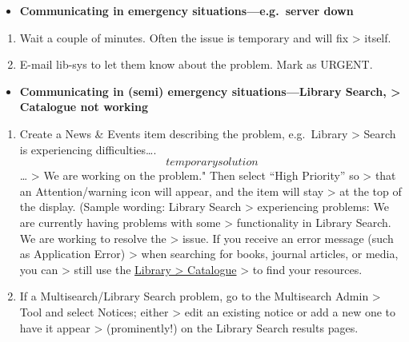 \documentclass[
  openany]{book}
\providecommand{\tightlist}{%
  \setlength{\itemsep}{0pt}\setlength{\parskip}{0pt}}
\begin{document}
\begin{itemize}
\tightlist
\item
  \textbf{Communicating in emergency situations---e.g.~server down}
\end{itemize}

\begin{enumerate}
\def\labelenumi{\arabic{enumi}.}
\item
  Wait a couple of minutes. Often the issue is temporary and will fix
  \textgreater{} itself.
\item
  E-mail lib-sys to let them know about the problem. Mark as URGENT.
\end{enumerate}

\begin{itemize}
\tightlist
\item
  \textbf{Communicating in (semi) emergency situations---Library Search,
  \textgreater{} Catalogue not working}
\end{itemize}

\begin{enumerate}
\def\labelenumi{\arabic{enumi}.}
\item
  Create a News \& Events item describing the problem, e.g.~Library
  \textgreater{} Search is experiencing difficulties\ldots. \[temporary solution\]\ldots{}
  \textgreater{} We are working on the problem." Then select ``High Priority'' so
  \textgreater{} that an Attention/warning icon will appear, and the item will stay
  \textgreater{} at the top of the display. (Sample wording: Library Search
  \textgreater{} experiencing problems: We are currently having problems with some
  \textgreater{} functionality in Library Search. We are working to resolve the
  \textgreater{} issue. If you receive an error message (such as Application Error)
  \textgreater{} when searching for books, journal articles, or media, you can
  \textgreater{} still use the \href{https://sfu-primo.hosted.exlibrisgroup.com/primo-explore/search?vid=SFUL\&sortby=rank}{Library
  \textgreater{} Catalogue}
  \textgreater{} to find your resources.
\item
  If a Multisearch/Library Search problem, go to the Multisearch Admin
  \textgreater{} Tool and select Notices; either
  \textgreater{} edit an existing notice or add a new one to have it appear
  \textgreater{} (prominently!) on the Library Search results pages.
\end{enumerate}
\end{document}
